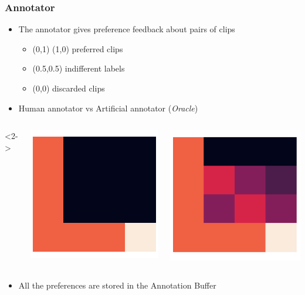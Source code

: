 \begin{frame}
\frametitle{Annotator}
\begin{itemize}
	\item The annotator gives preference feedback about pairs of clips
	\vspace{0.2cm}
	\begin{itemize}
		\item (0,1) (1,0) preferred clips
		\item (0.5,0.5) indifferent labels
		\item (0,0) discarded clips
	\end{itemize}
	
	\vspace{0.3cm}
	
	\item<2-> Human annotator vs Artificial annotator (\textit{Oracle})
	
\end{itemize}
\begin{columns}<2->
	\begin{column}{0.5\textwidth}
		\centering
		\includegraphics[width=0.5\linewidth]{images/sparse.png}
	\end{column}
	
	\begin{column}{0.5\textwidth}
		\centering
		\includegraphics[width=0.5\linewidth]{images/dense.png}
	\end{column}
\end{columns}

\vspace{0.3cm}

\begin{itemize}
	\item<3-> All the preferences are stored in the Annotation Buffer
\end{itemize}

\end{frame}


